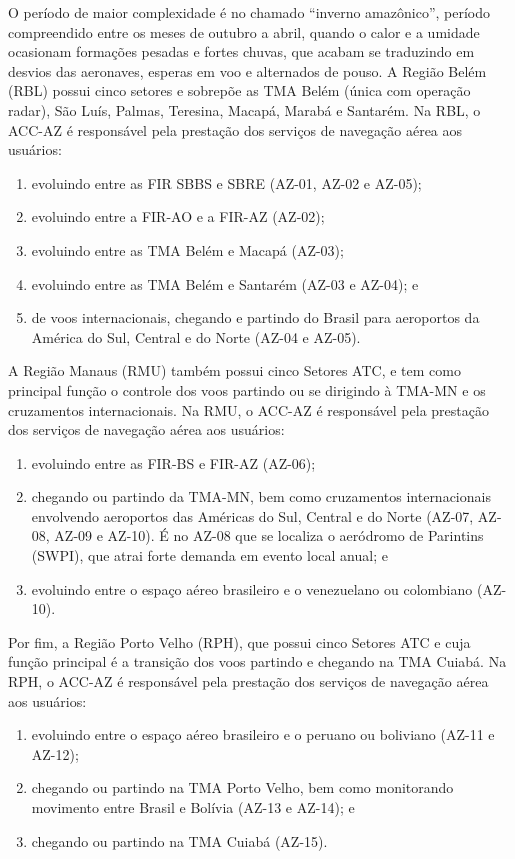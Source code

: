 \documentclass[
]{book}
\begin{document}
O período de maior complexidade é no chamado ``inverno amazônico'', período compreendido entre os meses de outubro a abril, quando o calor e a umidade ocasionam formações pesadas e fortes chuvas, que acabam se traduzindo em desvios das aeronaves, esperas em voo e alternados de pouso.
A Região Belém (RBL) possui cinco setores e sobrepõe as TMA Belém (única com operação radar), São Luís, Palmas, Teresina, Macapá, Marabá e Santarém. Na RBL, o ACC-AZ é responsável pela prestação dos serviços de navegação aérea aos usuários:

\begin{enumerate}
\def\labelenumi{\alph{enumi})}
\item
  evoluindo entre as FIR SBBS e SBRE (AZ-01, AZ-02 e AZ-05);
\item
  evoluindo entre a FIR-AO e a FIR-AZ (AZ-02);
\item
  evoluindo entre as TMA Belém e Macapá (AZ-03);
\item
  evoluindo entre as TMA Belém e Santarém (AZ-03 e AZ-04); e
\item
  de voos internacionais, chegando e partindo do Brasil para aeroportos da América do Sul, Central e do Norte (AZ-04 e AZ-05).
\end{enumerate}

A Região Manaus (RMU) também possui cinco Setores ATC, e tem como principal função o controle dos voos partindo ou se dirigindo à TMA-MN e os cruzamentos internacionais. Na RMU, o ACC-AZ é responsável pela prestação dos serviços de navegação aérea aos usuários:

\begin{enumerate}
\def\labelenumi{\alph{enumi})}
\item
  evoluindo entre as FIR-BS e FIR-AZ (AZ-06);
\item
  chegando ou partindo da TMA-MN, bem como cruzamentos internacionais envolvendo aeroportos das Américas do Sul, Central e do Norte (AZ-07, AZ-08, AZ-09 e AZ-10). É no AZ-08 que se localiza o aeródromo de Parintins (SWPI), que atrai forte demanda em evento local anual; e
\item
  evoluindo entre o espaço aéreo brasileiro e o venezuelano ou colombiano (AZ-10).
\end{enumerate}

Por fim, a Região Porto Velho (RPH), que possui cinco Setores ATC e cuja função principal é a transição dos voos partindo e chegando na TMA Cuiabá. Na RPH, o ACC-AZ é responsável pela prestação dos serviços de navegação aérea aos usuários:

\begin{enumerate}
\def\labelenumi{\alph{enumi})}
\item
  evoluindo entre o espaço aéreo brasileiro e o peruano ou boliviano (AZ-11 e AZ-12);
\item
  chegando ou partindo na TMA Porto Velho, bem como monitorando movimento entre Brasil e Bolívia (AZ-13 e AZ-14); e
\item
  chegando ou partindo na TMA Cuiabá (AZ-15).
\end{enumerate}
\end{document}
